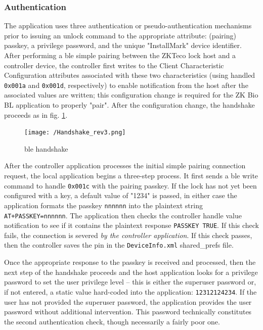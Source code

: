 \documentclass[conference]{IEEEtran}
\begin{document}
\bigskip
\subsubsection{Authentication}

The application uses three authentication or pseudo-authentication mechanisms prior to issuing an unlock command to the appropriate attribute: (pairing) passkey, a privilege password, and the unique "InstallMark" device identifier.  After performing a \gls{ble} simple pairing between the ZKTeco lock host and a controller device, the controller first writes to the Client Characteristic Configuration attributes associated with these two characteristics (using handled \verb|0x001a| and \verb|0x001d|, respectively) to enable notification from the host after the associated values are written; this configuration change is required for the ZK Bio BL application to properly "pair".   After the configuration change, the handshake proceeds as in fig. \ref{fig:handshake}.

\begin{figure}[ht]
  \texttt{[image: /Handshake\_rev3.png]}
  \caption{\gls{ble} handshake}
  \label{fig:handshake}
\end{figure}

\bigskip 

After the controller application processes the initial simple pairing connection request, the local application begins a three-step process.  It first sends a \gls{ble} write command to handle \verb|0x001c| with the pairing passkey.  If the lock has not yet been configured with a key, a default value of "1234" is passed, in either case the application formats the passkey \verb|nnnnnn| into the plaintext string \verb|AT+PASSKEY=nnnnnn|.  The application then checks the controller handle value notification to see if it contains the plaintext response \verb|PASSKEY TRUE|.  If this check fails, the connection is severed \textit{by the controller application}.  If this check passes, then the controller saves the pin in the \verb|DeviceInfo.xml| shared\_prefs file.

\bigskip

Once the appropriate response to the passkey is received and processed, then the next step of the handshake proceeds and the host application looks for a privilege password to set the user privilege level -- this is either the superuser password or, if not entered, a static value hard-coded into the application: \verb|12312124234|.  If the user has not provided the superuser password, the application provides the user password without additional intervention.  This password technically constitutes the second authentication check, though necessarily a fairly poor one.
\end{document}
